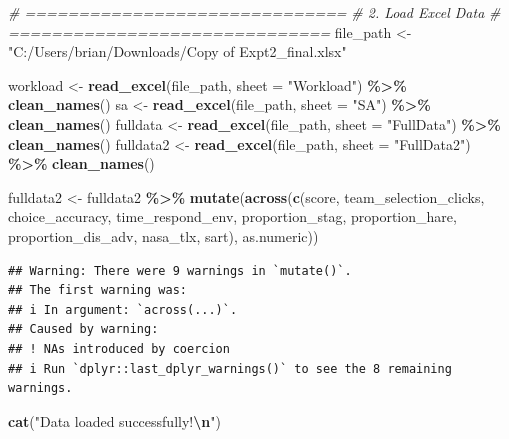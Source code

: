 \documentclass[
]{article}
\newenvironment{Shaded}{\begin{snugshade}}{\end{snugshade}}
\newcommand{\AttributeTok}[1]{\textcolor[rgb]{0.13,0.29,0.53}{#1}}
\newcommand{\CommentTok}[1]{\textcolor[rgb]{0.56,0.35,0.01}{\textit{#1}}}
\newcommand{\FunctionTok}[1]{\textcolor[rgb]{0.13,0.29,0.53}{\textbf{#1}}}
\newcommand{\NormalTok}[1]{#1}
\newcommand{\OtherTok}[1]{\textcolor[rgb]{0.56,0.35,0.01}{#1}}
\newcommand{\SpecialCharTok}[1]{\textcolor[rgb]{0.81,0.36,0.00}{\textbf{#1}}}
\newcommand{\StringTok}[1]{\textcolor[rgb]{0.31,0.60,0.02}{#1}}
\begin{document}
\begin{Shaded}
\begin{Highlighting}[]
\CommentTok{\# ==============================}
\CommentTok{\# 2. Load Excel Data}
\CommentTok{\# ==============================}
\NormalTok{file\_path }\OtherTok{\textless{}{-}} \StringTok{"C:/Users/brian/Downloads/Copy of Expt2\_final.xlsx"}

\NormalTok{workload  }\OtherTok{\textless{}{-}} \FunctionTok{read\_excel}\NormalTok{(file\_path, }\AttributeTok{sheet =} \StringTok{"Workload"}\NormalTok{)  }\SpecialCharTok{\%\textgreater{}\%} \FunctionTok{clean\_names}\NormalTok{()}
\NormalTok{sa        }\OtherTok{\textless{}{-}} \FunctionTok{read\_excel}\NormalTok{(file\_path, }\AttributeTok{sheet =} \StringTok{"SA"}\NormalTok{)        }\SpecialCharTok{\%\textgreater{}\%} \FunctionTok{clean\_names}\NormalTok{()}
\NormalTok{fulldata  }\OtherTok{\textless{}{-}} \FunctionTok{read\_excel}\NormalTok{(file\_path, }\AttributeTok{sheet =} \StringTok{"FullData"}\NormalTok{)  }\SpecialCharTok{\%\textgreater{}\%} \FunctionTok{clean\_names}\NormalTok{()}
\NormalTok{fulldata2 }\OtherTok{\textless{}{-}} \FunctionTok{read\_excel}\NormalTok{(file\_path, }\AttributeTok{sheet =} \StringTok{"FullData2"}\NormalTok{) }\SpecialCharTok{\%\textgreater{}\%} \FunctionTok{clean\_names}\NormalTok{()}

\NormalTok{fulldata2 }\OtherTok{\textless{}{-}}\NormalTok{ fulldata2 }\SpecialCharTok{\%\textgreater{}\%}
  \FunctionTok{mutate}\NormalTok{(}\FunctionTok{across}\NormalTok{(}\FunctionTok{c}\NormalTok{(score, team\_selection\_clicks, choice\_accuracy, time\_respond\_env,}
\NormalTok{                  proportion\_stag, proportion\_hare, proportion\_dis\_adv,}
\NormalTok{                  nasa\_tlx, sart), as.numeric))}
\end{Highlighting}
\end{Shaded}

\begin{verbatim}
## Warning: There were 9 warnings in `mutate()`.
## The first warning was:
## i In argument: `across(...)`.
## Caused by warning:
## ! NAs introduced by coercion
## i Run `dplyr::last_dplyr_warnings()` to see the 8 remaining warnings.
\end{verbatim}

\begin{Shaded}
\begin{Highlighting}[]
\FunctionTok{cat}\NormalTok{(}\StringTok{"Data loaded successfully!}\SpecialCharTok{\textbackslash{}n}\StringTok{"}\NormalTok{)}
\end{Highlighting}
\end{Shaded}
\end{document}
